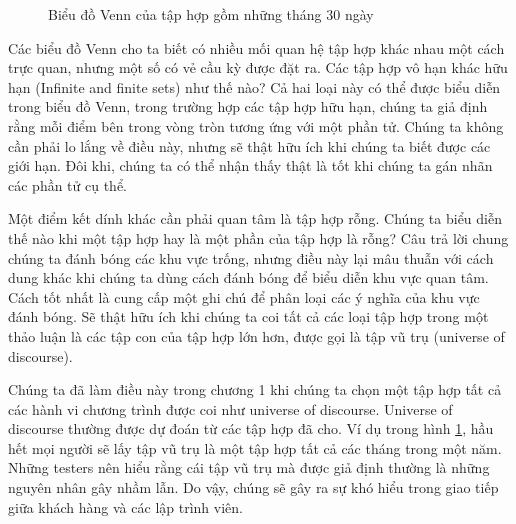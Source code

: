 \documentclass[11pt,a4paper,oneside]{article}
\begin{document}
\begin{figure}
\setlength\fboxsep{1mm}
\setlength\fboxrule{1pt}
\begin{center}
\caption{Biểu đồ Venn của tập hợp gồm những tháng 30 ngày}
\label{fig:mtran_ima1}
\end{center}
\end{figure}
Các biểu đồ Venn cho ta biết có nhiều mối quan hệ tập hợp khác nhau một cách trực quan, nhưng một số có vẻ cầu kỳ được đặt ra. Các tập hợp vô hạn khác hữu hạn (Infinite and finite sets) như thế nào? Cả hai loại này có thể được biểu diễn trong biểu đồ Venn, trong trường hợp các tập hợp hữu hạn, chúng ta giả định rằng mỗi điểm bên trong vòng tròn tương ứng với một phần tử. Chúng ta không cần phải lo lắng về điều này, nhưng sẽ thật hữu ích khi chúng ta biết được các giới hạn. Đôi khi, chúng ta có thể nhận thấy thật là tốt khi chúng ta gán nhãn các phần tử cụ thể. 

Một điểm kết dính khác cần phải quan tâm là tập hợp rỗng. Chúng ta biểu diễn thế nào khi một tập hợp hay là một phần của tập hợp là rỗng? Câu trả lời chung chúng ta đánh bóng các khu vực trống, nhưng điều này lại mâu thuẫn với cách dung khác khi chúng ta dùng cách đánh bóng để biểu diễn khu vực quan tâm. Cách tốt nhất là cung cấp một ghi chú để phân loại các ý nghĩa của khu vực đánh bóng. 
Sẽ thật hữu ích khi chúng ta coi tất cả các loại tập hợp trong một thảo luận là các tập con của tập hợp lớn hơn, được gọi là tập vũ trụ (universe of discourse). 

Chúng ta đã làm điều này trong chương 1 khi chúng ta chọn một tập hợp tất cả các hành vi chương trình được coi như universe of discourse. Universe of discourse thường được dự đoán từ các tập hợp đã cho. Ví dụ trong hình \ref{fig:mtran_ima1}, hầu hết mọi người sẽ lấy tập vũ trụ là một tập hợp tất cả các tháng trong một năm. Những testers nên hiểu rằng cái tập vũ trụ mà được giả định thường là những nguyên nhân gây nhầm lẫn. Do vậy, chúng sẽ gây ra sự khó hiểu trong giao tiếp giữa khách hàng và các lập trình viên.
\end{document}
